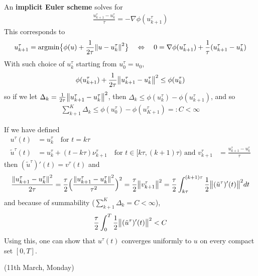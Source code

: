 \documentclass[12pt,a4paper]{article}
\begin{document}
\quad An \textbf{implicit Euler scheme} solves for
\begin{align*}
\frac{u_{k+1}^{\tau} - u_k^{\tau}}{\tau} = -\nabla \phi (u_{k+1}^{\tau})
\end{align*}
This corresponds to
\begin{align*}
u_{k+1}^{\tau} = \text{argmin} \big\{ \phi(u) + \frac{1}{2\tau} \snorms{u- u_k^{\tau}}{}^2 \big\} \quad \Leftrightarrow \quad 0 =\nabla \phi(u^{\tau}_{k+1}) + \frac{1}{\tau}(u^{\tau}_{k+1} - u^{\tau}_k)
\end{align*}
With such choice of $u^{\tau}_{k}$ starting from $u^{\tau}_0 =u_0$,
\begin{align*}
\phi(u_{k+1}^{\tau}) + \frac{1}{2\tau} \bigl\lVert u^{\tau}_{k+1} - u^{\tau}_{k}\bigr\rVert_{}^2 \leq \phi(u_k^{\tau})
\end{align*}
so if we let $\Delta_k = \frac{1}{2\tau} \bigl\lVert u^{\tau}_{k+1}- u_k^{\tau}\bigr\rVert_{}^2$, then $\Delta_k \leq \phi(u_k^{\tau}) - \phi(u^{\tau}_{k+1})$, and so
\begin{align*}
\sum_{k+1}^K \Delta_k \leq \phi(u_0^{\tau}) - \phi(u^{\tau}_{K+1}) =: C < \infty
\end{align*}
\s

If we have defined
\begin{align*}
u^{\tau}(t) &= u^{\tau}_k \quad \text{for } t= k\tau \\
\tilde{u}^{\tau}(t) &= u_k^{\tau} + (t- k \tau) \nu^{\tau}_{k+1} \quad \text{for } t \in [ k\tau, (k+1) \tau ) \text{ and } v_{k+1}^{\tau} &= \frac{u_{k+1}^{\tau}- u_k^{\tau}}{\tau}
\end{align*}
then $(\tilde{u}^{\tau})'(t) =v^{\tau}(t)$ and
\begin{align*}
\frac{ \snorms{ u^{\tau}_{k+1} - u^{\tau}_k }{}^2 }{2\tau} = \frac{\tau}{2} \Big( \frac{ \snorms{u^{\tau}_{k+1} - u^{\tau}_k}{}^2}{\tau^2} \Big)^2 = \frac{\tau}{2} \norms{v^{\tau}_{k+1}}{}^2 = \frac{\tau}{2} \int_{k\tau}^{(k+1)\tau} \frac{1}{2} \norms{ (\tilde{u}^{\tau})'(t) }{}^2 dt
\end{align*}
and because of summability ($\sum_{k+1}^K \Delta_k = C < \infty$), 
\begin{align*}
\frac{\tau}{2} \int_0^T \frac{1}{2}\bigl\lVert(\tilde{u}^{\tau})'(t)\bigr\rVert_{}^2 <C
\end{align*}
Using this, one can show that $u^{\tau}(t)$ converges uniformly to $u$ on every compact set $[0,T]$.
\s

\newday

(11th March, Monday)
\s
\end{document}
